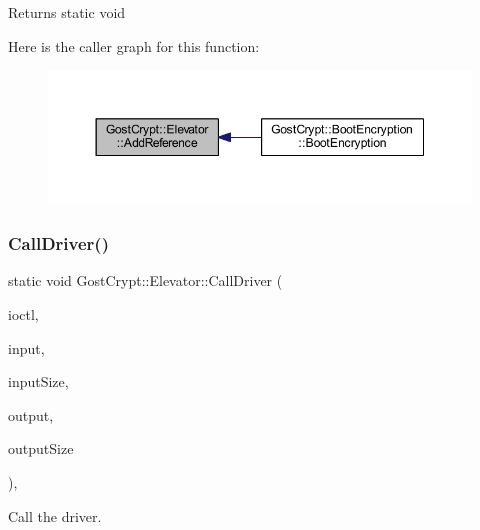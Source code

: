 \begin{DoxyReturn}{Returns}
static void 
\end{DoxyReturn}
Here is the caller graph for this function\+:
\nopagebreak
\begin{figure}[H]
\begin{center}
\leavevmode
\includegraphics[width=350pt]{class_gost_crypt_1_1_elevator_ae5fa1c4df5968245d213dd0a3cc3d93f_icgraph}
\end{center}
\end{figure}
\mbox{\label{class_gost_crypt_1_1_elevator_ab7e6ae353776bbd40daa2b4f55f0dc21}} 
\subsubsection{\texorpdfstring{Call\+Driver()}{CallDriver()}}
{\footnotesize\ttfamily static void Gost\+Crypt\+::\+Elevator\+::\+Call\+Driver (\begin{DoxyParamCaption}\item[{D\+W\+O\+RD}]{ioctl,  }\item[{void $\ast$}]{input,  }\item[{D\+W\+O\+RD}]{input\+Size,  }\item[{void $\ast$}]{output,  }\item[{D\+W\+O\+RD}]{output\+Size }\end{DoxyParamCaption})\hspace{0.3cm}{\ttfamily [inline]}, {\ttfamily [static]}}



Call the driver. 



